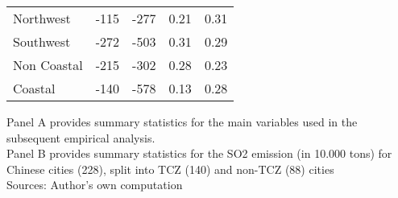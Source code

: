 \documentclass[12pt]{article}
\begin{document}
\begin{table}[!htbp]
\begin{adjustbox}{width=\textwidth, totalheight=\baselineskip,keepaspectratio}
\begin{tabular}{lrrrr}
      Northwest   &    -115 & -277 &     0.21 & 0.31 \\
      Southwest   &    -272 & -503 &     0.31 & 0.29 \\
      Non Coastal &    -215 & -302 &     0.28 & 0.23 \\
      Coastal     &    -140 & -578 &     0.13 & 0.28 \\
      \bottomrule
      \hline
    \end{tabular}
    \end{adjustbox}
    \begin{tablenotes}
      \small
      \item Panel A provides summary statistics for the main variables used in the subsequent empirical analysis. \\
      Panel B provides summary statistics for the SO2 emission (in 10.000 tons) for Chinese cities (228), split into TCZ (140) and non-TCZ (88) cities
      \\
      Sources: Author's own computation
    \end{tablenotes}
\end{table}

\hfill \break
\end{document}
